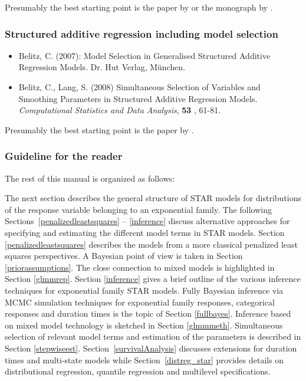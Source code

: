 \documentclass[11pt,a4paper,twoside]{bayesxarticle}
\begin{document}
Presumably the best starting point is the paper by  or the monograph by .

\subsubsection*{Structured additive regression including model selection}

\begin{itemize}
\item Belitz, C. (2007): Model Selection in Generalised Structured Additive Regression Models. Dr. Hut Verlag, M\"{u}nchen.
\item Belitz, C., Lang, S. (2008) Simultaneous Selection of Variables and Smoothing Parameters
in Structured Additive Regression Models. {\it
Computational Statistics and Data Analysis}, {\bf 53} , 61-81.
\end{itemize}

Presumably the best starting point is the paper by .

\subsubsection*{Guideline for the reader}


The rest of this manual is organized as follows:

The next section describes the general structure of STAR models for
distributions of the response variable belonging to an exponential
family. The following Sections~\ref{penalizedleastsquares} --
\ref{inference} discuss alternative approaches for specifying and
estimating the different model terms in STAR models. Section
\ref{penalizedleastsquares} describes the models from a more
classical penalized least squares perspectives. A Bayesian point of
view is taken in Section \ref{priorassumptions}. The close
connection to mixed models is highlighted in Section \ref{glmmrep}.
Section \ref{inference} gives a brief outline of the various
inference techniques for exponential family STAR models. Fully Bayesian inference via
MCMC simulation techniques for exponential family responses, categorical responses and duration times is the topic of Section \ref{fullbayes}.
Inference based on mixed model technology is sketched in Section
\ref{glmmmeth}. Simultaneous selection of relevant model terms and
estimation of the parameters is described in Section
\ref{stepwiseest}. Section~\ref{survivalAnalysis} discusses extensions for duration times and multi-state models while Section~\ref{distreg_star} provides details on distributional regression, quantile regression and multilevel specifications.
\end{document}
